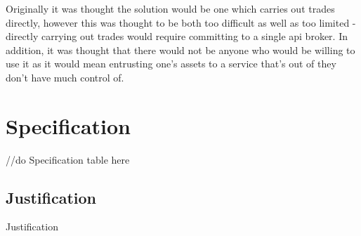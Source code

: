     Originally it was thought the solution would be one which carries out trades directly, however this was thought to be both too difficult as well as too limited - directly carrying out trades would require committing to a single api broker. In addition, it was thought that there would not be anyone who would be willing to use it as it would mean entrusting one's assets to a service that's out of they don't have much control of. 


    \section{Specification}
        
    
    //do Specification table here


        
        \subsection{Justification}

        Justification
